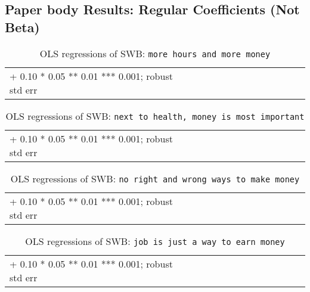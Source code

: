 \documentclass[10pt, letterpaper]{article}
\begin{document}
\begin{spacing}{1.8}
\section{Paper body Results:  Regular Coefficients (Not Beta)}

\begin{spacing}{.9} \begin{table}[H]\centering  \label{a} \begin{scriptsize} \begin{tabular}{p{1.8in}p{.5in}p{.5in}p{.5in}p{.5in}p{.5in}p{.5in}p{.5in}p{.5in}p{.5in}p{.5 in}p{.5in}p{.5 in}}\hline  \hline + 0.10 * 0.05 ** 0.01 *** 0.001; robust std err \end{tabular}\end{scriptsize}\caption{OLS regressions of SWB: \texttt{more hours and more money}}\end{table} \end{spacing}

\begin{spacing}{.9} \begin{table}[H]\centering  \label{b} \begin{scriptsize} \begin{tabular}{p{1.8in}p{.5in}p{.5in}p{.5in}p{.5in}p{.5in}p{.5in}p{.5in}p{.5in}p{.5in}p{.5 in}p{.5in}p{.5 in}}\hline  \hline + 0.10 * 0.05 ** 0.01 *** 0.001; robust std err \end{tabular}\end{scriptsize}\caption{OLS regressions of SWB: \texttt{next to  health, money is most  important}}\end{table} \end{spacing}

\begin{spacing}{.9} \begin{table}[H]\centering  \label{c} \begin{scriptsize} \begin{tabular}{p{1.8in}p{.5in}p{.5in}p{.5in}p{.5in}p{.5in}p{.5in}p{.5in}p{.5in}p{.5in}p{.5 in}p{.5in}p{.5 in}}\hline  \hline + 0.10 * 0.05 ** 0.01 *** 0.001; robust std err \end{tabular}\end{scriptsize}\caption{OLS regressions of SWB: \texttt{no right  and wrong ways to  make money}}\end{table} \end{spacing}

\begin{spacing}{.9} \begin{table}[H]\centering  \label{d} \begin{scriptsize} \begin{tabular}{p{1.8in}p{.5in}p{.5in}p{.5in}p{.5in}p{.5in}p{.5in}p{.5in}p{.5in}p{.5in}p{.5 in}p{.5in}p{.5 in}}\hline  \hline + 0.10 * 0.05 ** 0.01 *** 0.001; robust std err \end{tabular}\end{scriptsize}\caption{OLS regressions of SWB:  \texttt{job is just a way to earn money}}\end{table} \end{spacing}



\end{spacing}
\end{document}
